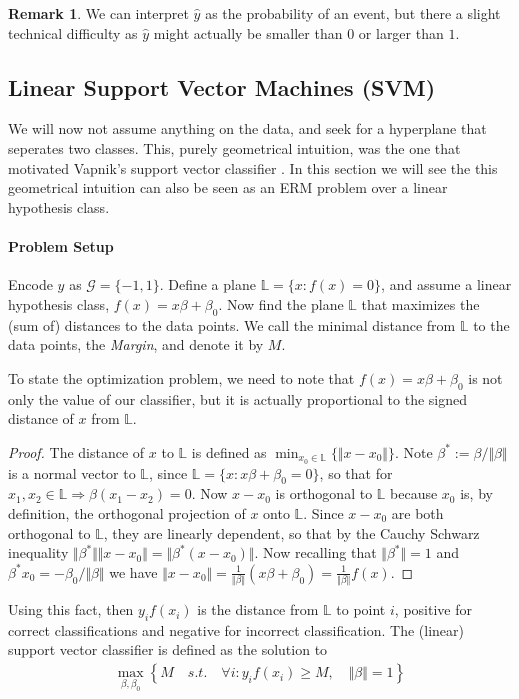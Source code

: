 \documentclass[12pt,a4paper]{article}
\theoremstyle{plain}
\theoremstyle{definition}
\newtheorem{remark}{Remark}
\newcommand{\norm}[1]{\Vert #1 \Vert}
\newcommand{\hyp}{f}
\newcommand{\plane}{\mathbb{L}}
\newcommand{\categories}{\mathcal{G}}
\begin{document}
\begin{remark}
We can interpret $\hat{y}$ as the probability of an event, but there a slight technical difficulty as $\hat{y}$ might actually be smaller than $0$ or larger than $1$.
\end{remark}


\subsection{Linear Support Vector Machines (SVM)}
We will now not assume anything on the data, and seek for a hyperplane that seperates two classes.
This, purely geometrical intuition, was the one that motivated Vapnik's support vector classifier \citep{vapnik_statistical_1998}.
In this section we will see the this geometrical intuition can also be seen as an ERM problem over a linear hypothesis class.

\paragraph{Problem Setup}
Encode $y$ as $\categories=\{-1,1\}$.
Define a plane $\plane=\{x: \hyp(x)=0 \}$, and assume a linear hypothesis class, $\hyp(x)=x\beta+\beta_0$.
Now find the plane $\plane$ that maximizes the (sum of) distances to the data points.
We call the minimal distance from $\plane$ to the data points, the \emph{Margin}, and denote it by $M$.

To state the optimization problem, we need to note that $\hyp(x)=x\beta+\beta_0$ is not only the value of our classifier, but it is actually proportional to the signed distance of $x$ from $\plane$. 
\begin{proof}
The distance of $x$ to $\plane$ is defined as $\min_{x_0 \in \plane} \{ \norm{x-x_0} \}$.
Note $\beta^*:=\beta/\norm{\beta}$ is a normal vector to $\plane$, since $\plane=\{x: x\beta+\beta_0=0 \}$, so that for $x_1,x_2 \in \plane \Rightarrow \beta(x_1-x_2)=0$.
Now $x-x_0$ is orthogonal to $\plane$ because $x_0$ is, by definition, the orthogonal projection of $x$ onto $\plane$.
Since $x-x_0$ are both orthogonal to $\plane$, they are linearly dependent, so that by the Cauchy Schwarz inequality $\norm{\beta^*} \norm{x-x_0}= \norm{\beta^*(x-x_0)}$.
Now recalling that $\norm{\beta^*}=1$ and $\beta^* x_0=-\beta_0/\norm{\beta}$ we have $\norm{x-x_0}=\frac{1}{\norm{\beta}} (x\beta+\beta_0)= \frac{1}{\norm{\beta}} \hyp(x)$.
\end{proof}

Using this fact, then $y_i \hyp(x_i)$ is the distance from $\plane$ to point $i$, positive for correct classifications and negative for incorrect classification. 
The (linear) support vector classifier is defined as the solution to
\begin{align}
\label{eq:svc_separable}
	\max_{\beta,\beta_0} \left\{ 
		M \quad s.t. \quad 
		\forall i: y_i \hyp(x_i) \geq M, \quad \norm{\beta}=1
	\right\}
\end{align}
\end{document}
